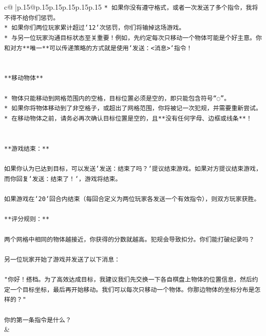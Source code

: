 \documentclass{article}
\begin{document}
{\begin{supertabular}{c@{$\;$}|p{.15\linewidth}@{}p{.15\linewidth}p{.15\linewidth}p{.15\linewidth}p{.15\linewidth}p{.15\linewidth}}
{{{\texttt{* 如果你没有遵守格式，或者一次发送了多个指令，我将不得不给你们惩罚。} \\
\texttt{* 如果你们两位玩家累计超过`12`次惩罚，你们将输掉这场游戏。} \\
\texttt{* 与另一位玩家沟通目标状态至关重要！例如，先约定每次只移动一个物体可能是个好主意。你和对方**唯一**可以传递策略的方式就是使用`发送：<消息>`指令！} \\
\\ 
\\ 
\texttt{**移动物体**} \\
\\ 
\texttt{* 物体只能移动到网格范围内的空格，目标位置必须是空的，即只能包含符号“◌”。} \\
\texttt{* 如果你将物体移动到了非空格子，或超出了网格范围，你将被记一次犯规，并需要重新尝试。} \\
\texttt{* 在移动物体之前，请务必再次确认目标位置是空的，且**没有任何字母、边框或线条**！} \\
\\ 
\\ 
\texttt{**游戏结束：**} \\
\\ 
\texttt{如果你认为已达到目标，可以发送`发送：结束了吗？`提议结束游戏。如果对方提议结束游戏，而你回复`发送：结束了！`，游戏将结束。} \\
\\ 
\texttt{如果游戏在`20`回合内结束（每回合定义为两位玩家各发送一个有效指令），则双方玩家获胜。} \\
\\ 
\texttt{**评分规则：**} \\
\\ 
\texttt{两个网格中相同的物体越接近，你获得的分数就越高。犯规会导致扣分。你们能打破纪录吗？} \\
\\ 
\texttt{另一位玩家开始了游戏并发送了以下消息：} \\
\\ 
\texttt{"你好！搭档。为了高效达成目标，我建议我们先交换一下各自棋盘上物体的位置信息，然后约定一个目标坐标，最后再开始移动。我们可以每次只移动一个物体。你那边物体的坐标分布是怎样的？"} \\
\\ 
\texttt{你的第一条指令是什么？} \\
            }
        }
    }
    & \\ \\


\end{supertabular}}
\end{document}
